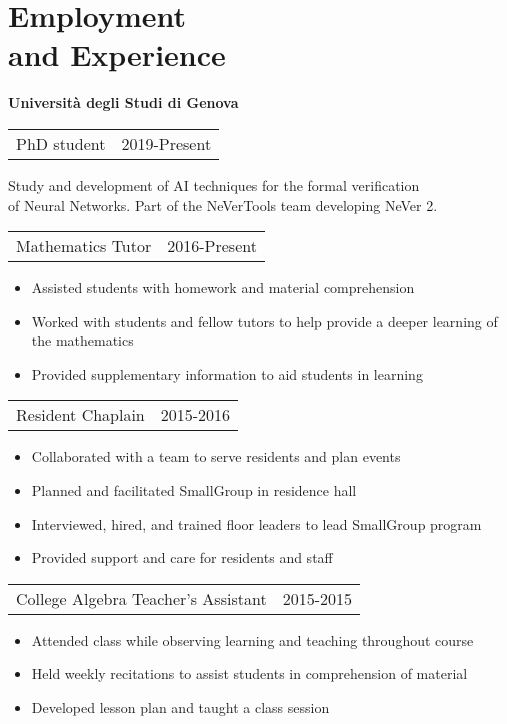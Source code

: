 \section{\sc Employment \\and Experience}
{\bf{Universit\`a degli Studi di Genova}}\\
\begin{tabular}{@{}p{4in}p{2in}}
PhD student & 2019-Present\\
\end{tabular}
Study and development of AI techniques for the formal verification\\
of Neural Networks. Part of the NeVerTools team developing NeVer 2.


\begin{tabular}{@{}p{4in}p{2in}}
Mathematics Tutor & 2016-Present\\
\end{tabular}
\begin{itemize}
\setlength\itemsep{0em}
\item Assisted students with homework and material comprehension 
\item Worked with students and fellow tutors to help provide a deeper learning of the mathematics
\item Provided supplementary information to aid students in learning
\end{itemize}
\begin{tabular}{@{}p{4in}p{2in}}
Resident Chaplain & 2015-2016\\
\end{tabular}
\begin{itemize}
\setlength\itemsep{0em}
\item Collaborated with a team to serve residents and plan events
\item Planned and facilitated SmallGroup in residence hall
\item Interviewed, hired, and trained floor leaders to lead SmallGroup program
\item Provided support and care for residents and staff
\end{itemize}
\begin{tabular}{@{}p{4in}p{2in}}
College Algebra Teacher's Assistant & 2015-2015\\
\end{tabular}
\begin{itemize}
\setlength\itemsep{0em}
\item Attended class while observing learning and teaching throughout course
\item Held weekly recitations to assist students in comprehension of material
\item Developed lesson plan and taught a class session
\end{itemize}




\endinput